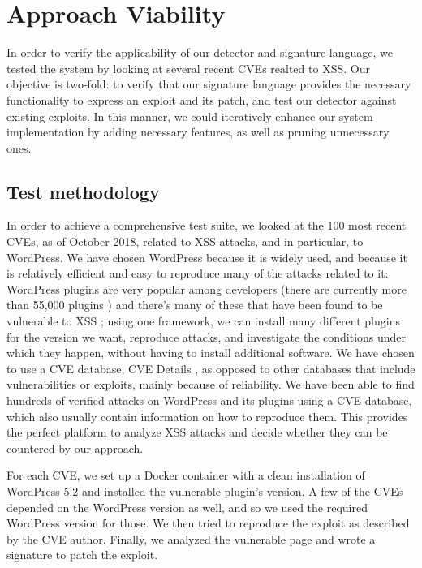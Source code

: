 \section{Approach Viability}

In order to verify the applicability of our detector and signature language, we tested the system by looking at several recent CVEs realted to XSS. Our objective is two-fold: to verify that our signature language provides the necessary functionality to express an exploit and its patch, and test our detector against existing exploits. In this manner, we could iteratively enhance our system implementation by adding necessary features, as well as pruning unnecessary ones.

\subsection{Test methodology}
In order to achieve a comprehensive test suite, we looked at the 100 most recent CVEs, as of October 2018, related to XSS attacks, and in particular, to WordPress. We have chosen WordPress because it is widely used, and because it is relatively efficient and easy to reproduce many of the attacks related to it: WordPress plugins are very popular among developers (there are currently more than 55,000 plugins \cite{wpplugins}) and there's many of these that have been found to be vulnerable to XSS \cite{wpscan}; using one framework, we can install many different plugins for the version we want, reproduce attacks, and investigate the conditions under which they happen, without having to install additional software. We have chosen to use a CVE database, CVE Details \cite{cvedetails}, as opposed to other databases that include vulnerabilities or exploits, mainly because of reliability. We have been able to find hundreds of verified attacks on WordPress and its plugins using a CVE database, which also usually contain information on how to reproduce them. This provides the perfect platform to analyze XSS attacks and decide whether they can be countered by our approach. 

For each CVE, we set up a Docker container with a clean installation of WordPress 5.2 and installed the vulnerable plugin's version. A few of the CVEs depended on the WordPress version as well, and so we used the required WordPress version for those. We then tried to reproduce the exploit as described by the CVE author. Finally, we analyzed the vulnerable page and wrote a signature to patch the exploit.

